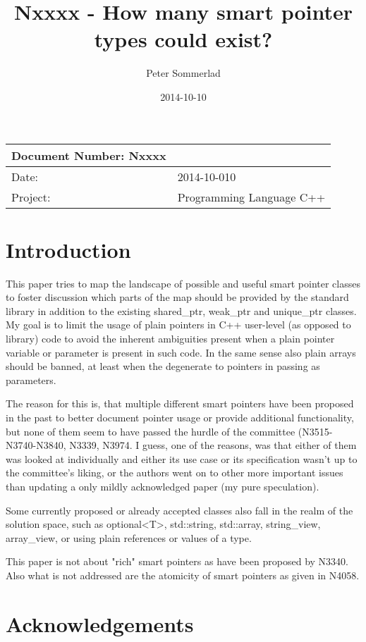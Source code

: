 \documentclass[ebook,11pt,article]{memoir}
\title{Nxxxx - How many smart pointer types could exist?}
\author{Peter Sommerlad}
\date{2014-10-10}                                           %
\begin{document}
\maketitle
\begin{tabular}[t]{|l|l|}\hline 
Document Number: Nxxxx &  \\\hline
Date: & 2014-10-010 \\\hline
Project: & Programming Language C++\\\hline 
\end{tabular}

\chapter{Introduction}
This paper tries to map the landscape of possible and useful smart pointer classes to foster discussion which parts of the map should be provided by the standard library in addition to the existing shared_ptr, weak_ptr and unique_ptr classes. My goal is to limit the usage of plain pointers in C++ user-level (as opposed to library) code to avoid the inherent ambiguities present when a plain pointer variable or parameter is present in such code. In the same sense also plain arrays should be banned, at least when the degenerate to pointers in passing as parameters.

The reason for this is, that multiple different smart pointers have been proposed in the past to better document pointer usage or provide additional functionality, but none of them seem to have passed the hurdle of the committee (N3515-N3740-N3840, N3339, N3974. I guess, one of the reasons, was that either of them was looked at individually and either its use case or its specification wasn't up to the committee's liking, or the authors went on to other more important issues than updating a only mildly acknowledged paper (my pure speculation).

Some currently proposed or already accepted classes also fall in the realm of the solution space, such as optional<T>, std::string, std::array, string_view, array_view, or using plain references or values of a type.

This paper is not about "rich" smart pointers as have been proposed by N3340. Also what is not addressed are the atomicity of smart pointers as given in N4058.


\chapter{Acknowledgements}
\end{document}
